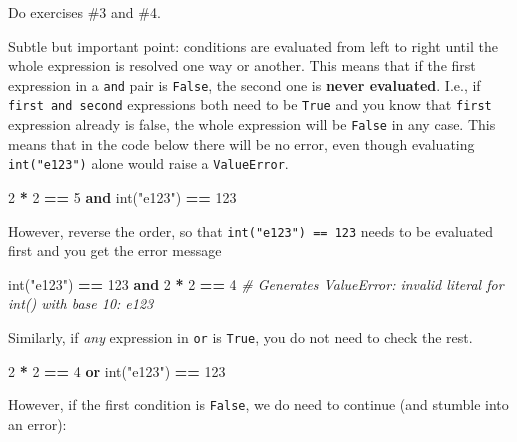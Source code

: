 \documentclass[
]{book}
\newenvironment{Shaded}{\begin{snugshade}}{\end{snugshade}}
\newcommand{\BuiltInTok}[1]{#1}
\newcommand{\CommentTok}[1]{\textcolor[rgb]{0.56,0.35,0.01}{\textit{#1}}}
\newcommand{\DecValTok}[1]{\textcolor[rgb]{0.00,0.00,0.81}{#1}}
\newcommand{\KeywordTok}[1]{\textcolor[rgb]{0.13,0.29,0.53}{\textbf{#1}}}
\newcommand{\NormalTok}[1]{#1}
\newcommand{\OperatorTok}[1]{\textcolor[rgb]{0.81,0.36,0.00}{\textbf{#1}}}
\newcommand{\StringTok}[1]{\textcolor[rgb]{0.31,0.60,0.02}{#1}}
\begin{document}
Do exercises \#3 and \#4.

Subtle but important point: conditions are evaluated from left to right until the whole expression is resolved one way or another. This means that if the first expression in a \texttt{and} pair is \texttt{False}, the second one is \textbf{never evaluated}. I.e., if \texttt{first\ and\ second} expressions both need to be \texttt{True} and you know that \texttt{first} expression already is false, the whole expression will be \texttt{False} in any case. This means that in the code below there will be no error, even though evaluating \texttt{int("e123")} alone would raise a \texttt{ValueError}.

\begin{Shaded}
\begin{Highlighting}[]
\DecValTok{2} \OperatorTok{*} \DecValTok{2} \OperatorTok{==} \DecValTok{5} \KeywordTok{and} \BuiltInTok{int}\NormalTok{(}\StringTok{"e123"}\NormalTok{) }\OperatorTok{==} \DecValTok{123}
\end{Highlighting}
\end{Shaded}

However, reverse the order, so that \texttt{int("e123")\ ==\ 123} needs to be evaluated first and you get the error message

\begin{Shaded}
\begin{Highlighting}[]
\BuiltInTok{int}\NormalTok{(}\StringTok{"e123"}\NormalTok{) }\OperatorTok{==} \DecValTok{123} \KeywordTok{and} \DecValTok{2} \OperatorTok{*} \DecValTok{2} \OperatorTok{==} \DecValTok{4}
\CommentTok{\# Generates ValueError: invalid literal for int() with base 10: \textquotesingle{}e123\textquotesingle{}}
\end{Highlighting}
\end{Shaded}

Similarly, if \emph{any} expression in \texttt{or} is \texttt{True}, you do not need to check the rest.

\begin{Shaded}
\begin{Highlighting}[]
\DecValTok{2} \OperatorTok{*} \DecValTok{2} \OperatorTok{==} \DecValTok{4} \KeywordTok{or} \BuiltInTok{int}\NormalTok{(}\StringTok{"e123"}\NormalTok{) }\OperatorTok{==} \DecValTok{123}
\end{Highlighting}
\end{Shaded}

However, if the first condition is \texttt{False}, we do need to continue (and stumble into an error):
\end{document}
